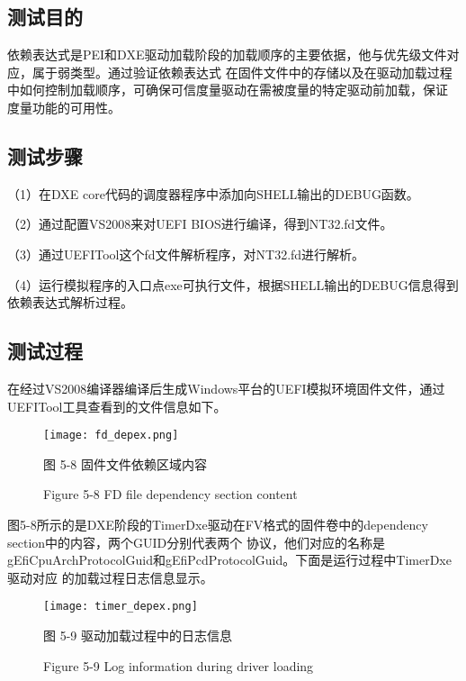 \subsection{测试目的}
依赖表达式是PEI和DXE驱动加载阶段的加载顺序的主要依据，他与优先级文件对应，属于弱类型。通过验证依赖表达式
在固件文件中的存储以及在驱动加载过程中如何控制加载顺序，可确保可信度量驱动在需被度量的特定驱动前加载，保证
度量功能的可用性。

\subsection{测试步骤}
（1）在DXE core代码的调度器程序中添加向SHELL输出的DEBUG函数。
\par （2）通过配置VS2008来对UEFI BIOS进行编译，得到NT32.fd文件。
\par （3）通过UEFITool这个fd文件解析程序，对NT32.fd进行解析。
\par （4）运行模拟程序的入口点exe可执行文件，根据SHELL输出的DEBUG信息得到依赖表达式解析过程。

\subsection{测试过程}
在经过VS2008编译器编译后生成Windows平台的UEFI模拟环境固件文件，通过UEFITool工具查看到的文件信息如下。

\begin{figure}[H]
    \label{ffs_format}
    \vspace{0cm}   
    \setlength{\abovecaptionskip}{0.3cm}
	\centering
    \texttt{[image: fd\_depex.png]}
    \caption*{图 5-8 固件文件依赖区域内容}
    \setlength{\belowcaptionskip}{-0.7cm}
    \caption*{Figure 5-8 FD file dependency section content}
\end{figure}

图5-8所示的是DXE阶段的TimerDxe驱动在FV格式的固件卷中的dependency section中的内容，两个GUID分别代表两个
协议，他们对应的名称是gEfiCpuArchProtocolGuid和gEfiPcdProtocolGuid。下面是运行过程中TimerDxe驱动对应
的加载过程日志信息显示。

\begin{figure}[H]
    \label{ffs_format}
    \vspace{0cm}   
    \setlength{\abovecaptionskip}{0.3cm}
	\centering
    \texttt{[image: timer\_depex.png]}
    \caption*{图 5-9 驱动加载过程中的日志信息}
    \setlength{\belowcaptionskip}{-0.7cm}
    \caption*{Figure 5-9 Log information during driver loading}
\end{figure}

